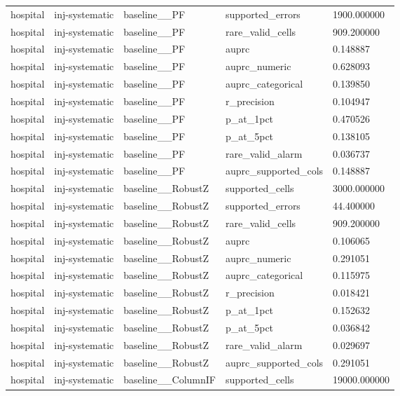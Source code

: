 \begin{tabular}{lllll}
hospital & inj-systematic & baseline\_\_PF & supported\_errors & 1900.000000 \\
hospital & inj-systematic & baseline\_\_PF & rare\_valid\_cells & 909.200000 \\
hospital & inj-systematic & baseline\_\_PF & auprc & 0.148887 \\
hospital & inj-systematic & baseline\_\_PF & auprc\_numeric & 0.628093 \\
hospital & inj-systematic & baseline\_\_PF & auprc\_categorical & 0.139850 \\
hospital & inj-systematic & baseline\_\_PF & r\_precision & 0.104947 \\
hospital & inj-systematic & baseline\_\_PF & p\_at\_1pct & 0.470526 \\
hospital & inj-systematic & baseline\_\_PF & p\_at\_5pct & 0.138105 \\
hospital & inj-systematic & baseline\_\_PF & rare\_valid\_alarm & 0.036737 \\
hospital & inj-systematic & baseline\_\_PF & auprc\_supported\_cols & 0.148887 \\
hospital & inj-systematic & baseline\_\_RobustZ & supported\_cells & 3000.000000 \\
hospital & inj-systematic & baseline\_\_RobustZ & supported\_errors & 44.400000 \\
hospital & inj-systematic & baseline\_\_RobustZ & rare\_valid\_cells & 909.200000 \\
hospital & inj-systematic & baseline\_\_RobustZ & auprc & 0.106065 \\
hospital & inj-systematic & baseline\_\_RobustZ & auprc\_numeric & 0.291051 \\
hospital & inj-systematic & baseline\_\_RobustZ & auprc\_categorical & 0.115975 \\
hospital & inj-systematic & baseline\_\_RobustZ & r\_precision & 0.018421 \\
hospital & inj-systematic & baseline\_\_RobustZ & p\_at\_1pct & 0.152632 \\
hospital & inj-systematic & baseline\_\_RobustZ & p\_at\_5pct & 0.036842 \\
hospital & inj-systematic & baseline\_\_RobustZ & rare\_valid\_alarm & 0.029697 \\
hospital & inj-systematic & baseline\_\_RobustZ & auprc\_supported\_cols & 0.291051 \\
hospital & inj-systematic & baseline\_\_ColumnIF & supported\_cells & 19000.000000 \\

\end{tabular}
